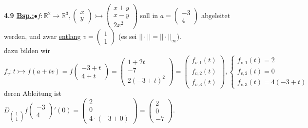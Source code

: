 \documentclass[]{scrartcl}
\begin{document}
	\textbf{4.9 \underline{Bsp.:}}$\bullet f: \mathbb{R}^2 \rightarrow\mathbb{R}^3, \begin{pmatrix}
		x\\y
	\end{pmatrix}\rightarrowtail \begin{pmatrix}
	x+y\\x-y\\2x^2
	\end{pmatrix}$ soll in $a=\begin{pmatrix}
	-3\\4
	\end{pmatrix}$ abgeleitet werden, und zwar \underline{entlang} $v=\begin{pmatrix}
	1\\1
	\end{pmatrix}$ (es sei $||\cdot||=||\cdot||_\infty$).\\
	dazu bilden wir $f_v: t\rightarrowtail f(a+tv)= f \begin{pmatrix}
		-3+t\\4+t
	\end{pmatrix}=\begin{pmatrix}
	1+2t\\-7\\2(-3+t)^2
	\end{pmatrix}=\begin{pmatrix}
	f_{v,1}(t)\\f_{v,2}(t)\\f_{v,3}(t)
	\end{pmatrix}, 
	\begin{cases}
	f_{v,1}(t)=2\\f_{v,2}(t)=0\\f_{v,3}(t)=4(-3+t)
	\end{cases}$\\
	deren Ableitung ist\\
	$D_{\begin{pmatrix}
		1\\1
	\end{pmatrix}} f\begin{pmatrix}
	-3\\4
	\end{pmatrix}'(0)=\begin{pmatrix}
	2\\0\\4\cdot(-3+0)
	\end{pmatrix}=\begin{pmatrix}
	2\\0\\-7
	\end{pmatrix}$.\\
\end{document}
